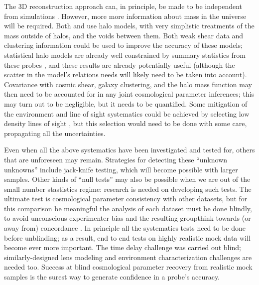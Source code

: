 The 3D reconstruction approach can, in principle, be made to be
independent from simulations \citep[indeed, this was a design feature
of][]{McCullyEtal2014}.  However, more  more information about mass in
the universe will be required.  Both \citet{McCullyEtal2014} and
\citet{CollettEtal2013} use halo models, with very simplistic treatments
of the mass outside of halos, and the voids between them. Both weak
shear data and clustering information could be used to improve the
accuracy of these  models; statistical halo models are already well
constrained by summary statistics from these probes
\citep[e.g.][]{CouponEtal2015},  and these results are already
potentially useful (although the scatter in the model's relations needs
will likely need to be taken into account).  Covariance with cosmic
shear, galaxy clustering, and the halo mass function may then  need to
be accounted for in any joint cosmological parameter inferences; this
may turn out to be negligible, but it needs to be quantified.  Some
mitigation of the environment and line of sight systematics could be
achieved by selecting low density lines of sight
\citep{CollettEtal2013}, but this selection would need to be done with
some care, propagating all the uncertainties.



Even when all the above systematics have been investigated and tested
for, others that are unforeseen may remain. Strategies for detecting
these ``unknown unknowns'' include jack-knife testing, which  will
become possible with larger samples. Other kinds of ``null tests'' may
also be possible when we are out of the small number stastistics regime:
research is needed on developing such tests. The ultimate test is
cosmological parameter consistency with other datasets, but for this
comparison be meaningful the analysis of each dataset must be done
blindly, to avoid unconscious experimenter bias and the resulting
groupthink towards (or away from) concordance
\citep[see e.g.][]{ConleyEtal2006,SuyuEtal2013}. In principle all the
systematics tests  need to be done before unblinding; as a result, end
to end tests on highly realistic mock data will become ever more
important. The time delay challenge was carried out blind;
similarly-designed lens modeling and environment characterization
challenges are needed too. Success at blind cosmological parameter
recovery from realistic mock samples is the surest way to generate
confidence in a probe's accuracy.




